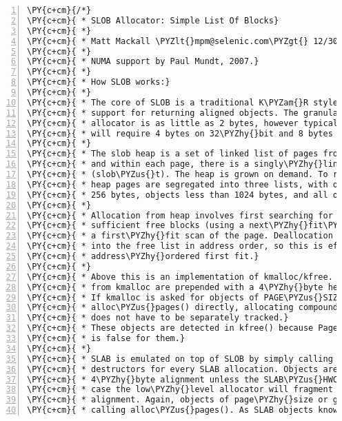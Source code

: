 \begin{Verbatim}[commandchars=\\\{\},numbers=left,firstnumber=1,stepnumber=1]
\PY{c+cm}{/*}
\PY{c+cm}{ * SLOB Allocator: Simple List Of Blocks}
\PY{c+cm}{ *}
\PY{c+cm}{ * Matt Mackall \PYZlt{}mpm@selenic.com\PYZgt{} 12/30/03}
\PY{c+cm}{ *}
\PY{c+cm}{ * NUMA support by Paul Mundt, 2007.}
\PY{c+cm}{ *}
\PY{c+cm}{ * How SLOB works:}
\PY{c+cm}{ *}
\PY{c+cm}{ * The core of SLOB is a traditional K\PYZam{}R style heap allocator, with}
\PY{c+cm}{ * support for returning aligned objects. The granularity of this}
\PY{c+cm}{ * allocator is as little as 2 bytes, however typically most architectures}
\PY{c+cm}{ * will require 4 bytes on 32\PYZhy{}bit and 8 bytes on 64\PYZhy{}bit.}
\PY{c+cm}{ *}
\PY{c+cm}{ * The slob heap is a set of linked list of pages from alloc\PYZus{}pages(),}
\PY{c+cm}{ * and within each page, there is a singly\PYZhy{}linked list of free blocks}
\PY{c+cm}{ * (slob\PYZus{}t). The heap is grown on demand. To reduce fragmentation,}
\PY{c+cm}{ * heap pages are segregated into three lists, with objects less than}
\PY{c+cm}{ * 256 bytes, objects less than 1024 bytes, and all other objects.}
\PY{c+cm}{ *}
\PY{c+cm}{ * Allocation from heap involves first searching for a page with}
\PY{c+cm}{ * sufficient free blocks (using a next\PYZhy{}fit\PYZhy{}like approach) followed by}
\PY{c+cm}{ * a first\PYZhy{}fit scan of the page. Deallocation inserts objects back}
\PY{c+cm}{ * into the free list in address order, so this is effectively an}
\PY{c+cm}{ * address\PYZhy{}ordered first fit.}
\PY{c+cm}{ *}
\PY{c+cm}{ * Above this is an implementation of kmalloc/kfree. Blocks returned}
\PY{c+cm}{ * from kmalloc are prepended with a 4\PYZhy{}byte header with the kmalloc size.}
\PY{c+cm}{ * If kmalloc is asked for objects of PAGE\PYZus{}SIZE or larger, it calls}
\PY{c+cm}{ * alloc\PYZus{}pages() directly, allocating compound pages so the page order}
\PY{c+cm}{ * does not have to be separately tracked.}
\PY{c+cm}{ * These objects are detected in kfree() because PageSlab()}
\PY{c+cm}{ * is false for them.}
\PY{c+cm}{ *}
\PY{c+cm}{ * SLAB is emulated on top of SLOB by simply calling constructors and}
\PY{c+cm}{ * destructors for every SLAB allocation. Objects are returned with the}
\PY{c+cm}{ * 4\PYZhy{}byte alignment unless the SLAB\PYZus{}HWCACHE\PYZus{}ALIGN flag is set, in which}
\PY{c+cm}{ * case the low\PYZhy{}level allocator will fragment blocks to create the proper}
\PY{c+cm}{ * alignment. Again, objects of page\PYZhy{}size or greater are allocated by}
\PY{c+cm}{ * calling alloc\PYZus{}pages(). As SLAB objects know their size, no separate}

\end{Verbatim}
